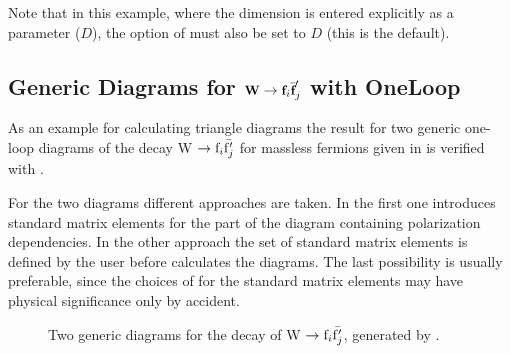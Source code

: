\enom
Note that in this example, where the dimension is entered explicitly as a 
parameter ($D$), the option  of  
must also be set to $D$ (this is the default). 

\subsection{Generic Diagrams for
${\rm {\small\tt \textbf{W}}} \rightarrow {\rm {\small\tt \textbf{f}}}_i \bar{{\small\tt \textbf{f}}}'_j$ with  OneLoop}
\label{generic}

As an example for calculating triangle diagrams the result 
for two generic one-loop diagrams of the 
decay W $\rightarrow {\rm f}_i \bar{{\rm f}'_j}$ for massless fermions
given in \cite{ansgar} 
is verified with \fc. 

For the two diagrams different approaches are taken. 
In the first one \fc introduces standard matrix elements 
for the part of the diagram containing polarization 
dependencies.
In the other approach the set of standard matrix elements is defined 
by the user before \fc calculates the diagrams.
The last possibility is usually preferable, since the choices of \fc
for the standard matrix elements may have physical significance only 
by accident.

\begin{figure}[H]
\begin{center}
\caption{Two generic diagrams for the decay of W $\rightarrow {\rm f}_i \bar{{\rm f}'_j}$, generated by \fa.}
\end{center}
\end{figure}

